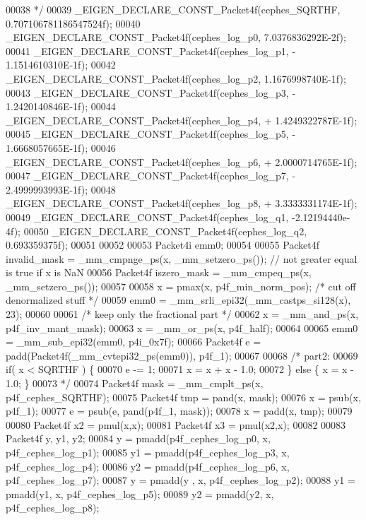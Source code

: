 \begin{DoxyCode}
00038 \textcolor{comment}{  */}
00039   \_EIGEN\_DECLARE\_CONST\_Packet4f(cephes\_SQRTHF, 0.707106781186547524f);
00040   \_EIGEN\_DECLARE\_CONST\_Packet4f(cephes\_log\_p0, 7.0376836292E-2f);
00041   \_EIGEN\_DECLARE\_CONST\_Packet4f(cephes\_log\_p1, - 1.1514610310E-1f);
00042   \_EIGEN\_DECLARE\_CONST\_Packet4f(cephes\_log\_p2, 1.1676998740E-1f);
00043   \_EIGEN\_DECLARE\_CONST\_Packet4f(cephes\_log\_p3, - 1.2420140846E-1f);
00044   \_EIGEN\_DECLARE\_CONST\_Packet4f(cephes\_log\_p4, + 1.4249322787E-1f);
00045   \_EIGEN\_DECLARE\_CONST\_Packet4f(cephes\_log\_p5, - 1.6668057665E-1f);
00046   \_EIGEN\_DECLARE\_CONST\_Packet4f(cephes\_log\_p6, + 2.0000714765E-1f);
00047   \_EIGEN\_DECLARE\_CONST\_Packet4f(cephes\_log\_p7, - 2.4999993993E-1f);
00048   \_EIGEN\_DECLARE\_CONST\_Packet4f(cephes\_log\_p8, + 3.3333331174E-1f);
00049   \_EIGEN\_DECLARE\_CONST\_Packet4f(cephes\_log\_q1, -2.12194440e-4f);
00050   \_EIGEN\_DECLARE\_CONST\_Packet4f(cephes\_log\_q2, 0.693359375f);
00051 
00052 
00053   Packet4i emm0;
00054 
00055   Packet4f invalid\_mask = \_mm\_cmpnge\_ps(x, \_mm\_setzero\_ps()); \textcolor{comment}{// not greater equal is true if x is NaN}
00056   Packet4f iszero\_mask = \_mm\_cmpeq\_ps(x, \_mm\_setzero\_ps());
00057 
00058   x = pmax(x, p4f\_min\_norm\_pos);  \textcolor{comment}{/* cut off denormalized stuff */}
00059   emm0 = \_mm\_srli\_epi32(\_mm\_castps\_si128(x), 23);
00060 
00061   \textcolor{comment}{/* keep only the fractional part */}
00062   x = \_mm\_and\_ps(x, p4f\_inv\_mant\_mask);
00063   x = \_mm\_or\_ps(x, p4f\_half);
00064 
00065   emm0 = \_mm\_sub\_epi32(emm0, p4i\_0x7f);
00066   Packet4f e = padd(Packet4f(\_mm\_cvtepi32\_ps(emm0)), p4f\_1);
00067 
00068   \textcolor{comment}{/* part2:}
00069 \textcolor{comment}{     if( x < SQRTHF ) \{}
00070 \textcolor{comment}{       e -= 1;}
00071 \textcolor{comment}{       x = x + x - 1.0;}
00072 \textcolor{comment}{     \} else \{ x = x - 1.0; \}}
00073 \textcolor{comment}{  */}
00074   Packet4f mask = \_mm\_cmplt\_ps(x, p4f\_cephes\_SQRTHF);
00075   Packet4f tmp = pand(x, mask);
00076   x = psub(x, p4f\_1);
00077   e = psub(e, pand(p4f\_1, mask));
00078   x = padd(x, tmp);
00079 
00080   Packet4f x2 = pmul(x,x);
00081   Packet4f x3 = pmul(x2,x);
00082 
00083   Packet4f y, y1, y2;
00084   y  = pmadd(p4f\_cephes\_log\_p0, x, p4f\_cephes\_log\_p1);
00085   y1 = pmadd(p4f\_cephes\_log\_p3, x, p4f\_cephes\_log\_p4);
00086   y2 = pmadd(p4f\_cephes\_log\_p6, x, p4f\_cephes\_log\_p7);
00087   y  = pmadd(y , x, p4f\_cephes\_log\_p2);
00088   y1 = pmadd(y1, x, p4f\_cephes\_log\_p5);
00089   y2 = pmadd(y2, x, p4f\_cephes\_log\_p8);

\end{DoxyCode}
